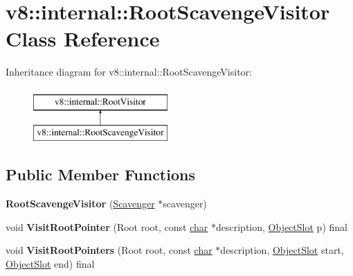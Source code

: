 \hypertarget{classv8_1_1internal_1_1RootScavengeVisitor}{}\section{v8\+:\+:internal\+:\+:Root\+Scavenge\+Visitor Class Reference}
\label{classv8_1_1internal_1_1RootScavengeVisitor}
Inheritance diagram for v8\+:\+:internal\+:\+:Root\+Scavenge\+Visitor\+:\begin{figure}[H]
\begin{center}
\leavevmode
\includegraphics[height=2.000000cm]{classv8_1_1internal_1_1RootScavengeVisitor}
\end{center}
\end{figure}
\subsection*{Public Member Functions}
\begin{DoxyCompactItemize}
\item 
\mbox{\label{classv8_1_1internal_1_1RootScavengeVisitor_abf671a8b55e22b73486ffae39e30ed76}} 
{\bfseries Root\+Scavenge\+Visitor} (\mbox{\hyperlink{classv8_1_1internal_1_1Scavenger}{Scavenger}} $\ast$scavenger)
\item 
\mbox{\label{classv8_1_1internal_1_1RootScavengeVisitor_a5e714ea8fef6d4ef9a3c1e09eb5d70fb}} 
void {\bfseries Visit\+Root\+Pointer} (Root root, const \mbox{\hyperlink{classchar}{char}} $\ast$description, \mbox{\hyperlink{classv8_1_1internal_1_1ObjectSlot}{Object\+Slot}} p) final
\item 
\mbox{\label{classv8_1_1internal_1_1RootScavengeVisitor_a1b56fe35071b4c8ee9694e43ba8207de}} 
void {\bfseries Visit\+Root\+Pointers} (Root root, const \mbox{\hyperlink{classchar}{char}} $\ast$description, \mbox{\hyperlink{classv8_1_1internal_1_1ObjectSlot}{Object\+Slot}} start, \mbox{\hyperlink{classv8_1_1internal_1_1ObjectSlot}{Object\+Slot}} end) final
\end{DoxyCompactItemize}
